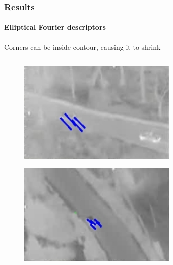 \begin{frame}
\frametitle{Results}
\framesubtitle{Elliptical Fourier descriptors}
\logoCSIPCPL\mypagenum
	Corners can be inside contour, causing it to shrink
	\begin{columns}
		\begin{column}{1in}

			\begin{figure}
				\includegraphics[width=1.5\textwidth]{figs/TRK_IGARSS2010_matching_0_30.jpg}
			\end{figure}
			\begin{figure}
				\includegraphics[width=1.5\textwidth]{figs/TRK_IGARSS2010_matching_1250_1277.jpg}
			\end{figure}
		\end{column}
		\begin{column}{1in}
			\begin{figure}

\end{figure}
\end{column}
\end{columns}
\end{frame}
